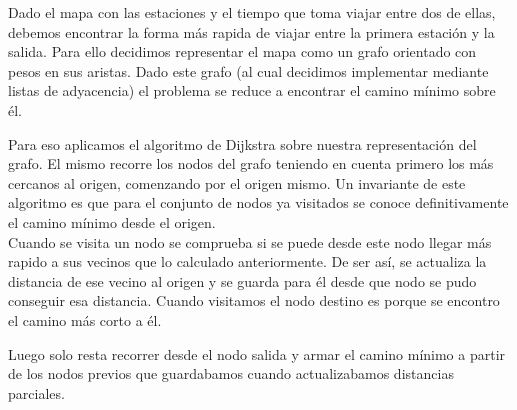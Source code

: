 Dado el mapa con las estaciones y el tiempo que toma viajar entre dos de ellas, debemos encontrar la forma más rapida de viajar entre la primera estación y la salida. Para ello decidimos representar el mapa como un grafo orientado con pesos en sus aristas. Dado este grafo (al cual decidimos implementar mediante listas de adyacencia) el problema se reduce a encontrar el camino mínimo sobre él.

Para eso aplicamos el algoritmo de Dijkstra sobre nuestra representación del grafo. 
El mismo recorre los nodos del grafo teniendo en cuenta primero los más cercanos al origen, comenzando por el origen mismo. Un invariante de este algoritmo es que para el conjunto de nodos ya visitados se conoce definitivamente el camino mínimo desde el origen.\\
Cuando se visita un nodo se comprueba si se puede desde este nodo llegar más rapido a sus vecinos que lo calculado anteriormente. De ser así, se actualiza la distancia de ese vecino al origen y se guarda para él desde que nodo se pudo conseguir esa distancia. Cuando visitamos el nodo destino es porque se encontro el camino más corto a él.


Luego solo resta recorrer desde el nodo salida y armar el camino mínimo a partir de los nodos previos que guardabamos cuando actualizabamos distancias parciales.